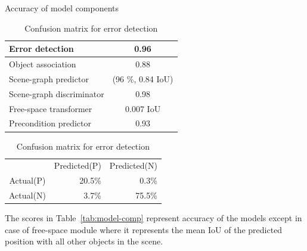 \begin{table}[ht]
    \begin{minipage}{.5\linewidth}
    \centering
    \caption{Accuracy of model components}
    \begin{tabular}{|l|c|}
    \hline
    Error detection & 0.96\\
    \hline
    Object association & 0.88\\
    \hline
    Scene-graph predictor & (96 \%, 0.84 IoU) \\
    \hline
    Scene-graph discriminator & 0.98\\
    \hline
    Free-space transformer & 0.007 IoU\\
    \hline
    Precondition predictor & 0.93\\
    \hline
    \end{tabular}
    \label{tab:model-comp}
    \end{minipage}
    \begin{minipage}{.5\linewidth}    
    \centering
    \caption{Confusion matrix for error detection}
    \begin{tabular}{c|r|r|}
    \multicolumn{1}{c}{}&\multicolumn{1}{c}{Predicted(P)}&\multicolumn{1}{c}{Predicted(N)}\\
    \cline{2-3}
    \multicolumn{1}{c|}{Actual(P)} & 20.5\% &  0.3\% \\
    \cline{2-3}
    \multicolumn{1}{c|}{Actual(N)} & 3.7\% & 75.5\% \\
    \cline{2-3}
    \end{tabular}
    \label{tab:confusion}
    \end{minipage}%
\end{table}
The scores in Table~\ref{tab:model-comp} represent accuracy of the models except in case of free-space module where it represents the mean IoU of the predicted position with all other objects in the scene.



